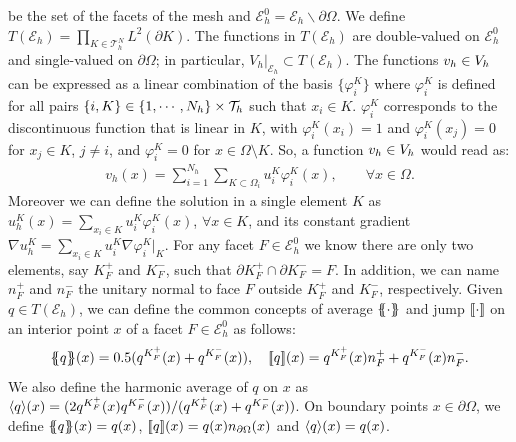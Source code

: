 be the set of the facets of the mesh and $\mathcal{E}_h^0=\mathcal{E}_h\backslash\partial\Omega$. We define $T(\mathcal{E}_h)=\prod_{K\in \mathcal{T}_h^N} L^2(\partial K)$. The functions in $T(\mathcal{E}_h) $ are double-valued on $\mathcal{E}_h^0$ and single-valued on $\partial \Omega$; in particular, $V_h|_{\mathcal{E}_h} \subset T(\mathcal{E}_h)$. The functions $v_h\in V_h$ can be expressed as a linear combination of the basis $\{\varphi_i^K\}$ where $\varphi_i^K$ is defined for all pairs $\{i,K\}\in \{1,\cdots,N_h\} \times \mathcal{T}_h$ such that $x_i\in K$.  $\varphi_i^K$ corresponds to the discontinuous function that is linear in $K$, with $\varphi_i^K(x_i) = 1$ and $\varphi_i^K(x_j)=0$ for $x_j\in K$, $j\neq i$, and  $\varphi_i^K = 0$ for $x\in\Omega\setminus K$. So, a function $v_h\in V_h$ would read as:
\begin{align*}
v_h(x) = \sum_{i=1}^{N_h} \sum_{K\subset \Omega_i} u_i^K \varphi_i^K (x),\qquad \forall x\in \Omega.
\end{align*}
Moreover we can define the solution in a single element $K$ as $u^K_h (x) = \sum_{x_i\in K} u_i^K \varphi_i^K (x)$, $\forall x\in K$, and its constant  gradient $\nabla u^K_h = \sum_{x_i\in K} u_i^K \nabla \varphi_i^K|_K $. %
For any facet $F\in\mathcal{E}_h^0$ we know there are only two elements, say $K_F^+$ and $K_F^-$, such that $\partial K_F^+\cap \partial K_F^- = F$. In addition, we can name $n_F^+$ and $n_F^-$ the unitary normal to face $F$ outside $K_F^+$ and $K_F^-$, respectively.  Given $q\in T(\mathcal{E}_h)$,  we can define the common concepts of average $\{\! \!\{ \cdot\}\! \!\}$ and jump $\lbrack\!\lbrack \cdot \rbrack\!\rbrack$ on an interior point $x$ of a facet $F\in \mathcal{E}_h^0$ as follows: $$\{\! \!\{ q\}\! \!\}(x)=0.5(q^{K_F^+}(x)+q^{K_F^-}(x)),\quad \lbrack\!\lbrack q \rbrack\!\rbrack(x) = q^{K_F^+}(x)n_F^++q^{K^-_F}(x)n_F^-. $$ We also define the harmonic average of $q$ on $x$ as $\langle q\rangle(x) = (2q^{K_F^+}(x)q^{K_F^-}(x))/(q^{K_F^+}(x)+q^{K_F^-}(x))$. On boundary points $x\in\partial\Omega$, we define $\{\! \!\{ q\}\! \!\}(x)=q(x)$, $\lbrack\!\lbrack q \rbrack\!\rbrack(x) = q(x) n_{\partial\Omega}(x)$ and $\langle q\rangle (x) = q(x)$.  %

